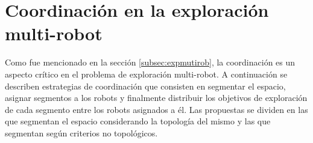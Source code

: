 




\section{Coordinación en la exploración multi-robot}\label{sec:coord}

Como fue mencionado en la sección \ref{subsec:expmutirob}, la coordinación es
un aspecto crítico en el problema de exploración multi-robot. A continuación se describen estrategias de coordinación que
consisten en segmentar el espacio, asignar segmentos a los robots y
finalmente distribuir los objetivos de exploración de cada segmento entre los
robots asignados a él. Las propuestas se dividen en las que segmentan el
espacio considerando la topología del mismo y las que segmentan según criterios
no topológicos.


